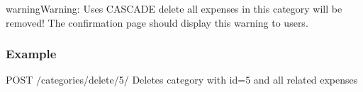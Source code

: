 \documentclass[letterpaper,10pt,english]{sphinxmanual}
\begin{document}
\begin{fulllineitems}
\begin{description}
\end{description}

\begin{sphinxadmonition}{warning}{Warning:}
\sphinxAtStartPar
Uses CASCADE delete \sphinxhyphen{} all expenses in this category will be removed!
The confirmation page should display this warning to users.
\end{sphinxadmonition}
\subsubsection*{Example}

\sphinxAtStartPar
POST /categories/delete/5/
Deletes category with id=5 and all related expenses

\end{fulllineitems}

\end{document}
